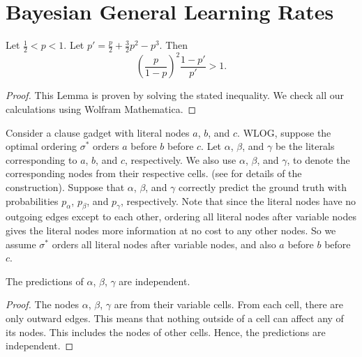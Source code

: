 \section{Bayesian General Learning Rates}
\label{app:bayesian_gadgets}

\begin{lemma}[ ]\label{lemma:twoInformedOneUninformed}
    Let $ \frac 12 < p < 1 $.
    Let $ p' = \frac p2 + \frac 32 p^2 - p^3 $.
    Then \[
        \left( \frac p{1-p} \right)^2 \frac {1-p'}{p'} > 1.
    \]
\end{lemma}

\begin{proof}
    This Lemma is proven by solving the stated inequality.
    We check all our calculations using Wolfram Mathematica.
\end{proof}

Consider a clause gadget with literal nodes $a$, $b$, and $c$.
WLOG, suppose the optimal ordering $\sigma^*$ orders $a$ before $b$ before $c$.
Let $\alpha$, $\beta$, and $\gamma$ be the literals corresponding to $ a $, $ b $, and $ c $, respectively.
We also use $\alpha$, $\beta$, and $\gamma$, to denote the corresponding nodes from their respective cells. (see  for details of the construction).
Suppose that $\alpha$, $\beta$, and $\gamma$ correctly predict the ground truth with probabilities $p_\alpha$, $p_\beta$, and $p_\gamma$, respectively.
Note that since the literal nodes have no outgoing edges except to each other, ordering all literal nodes after variable nodes gives the literal nodes more information at no cost to any other nodes.
So we assume $ \sigma^* $ orders all literal nodes after variable nodes, and also $a$ before $b$ before $c$. 



\begin{observation}
    The predictions of $ \alpha $, $ \beta $, $ \gamma $ are independent.
\end{observation}

\begin{proof}
    The nodes $ \alpha $, $ \beta $, $ \gamma $ are from their variable cells.
    From each cell, there are only outward edges.
    This means that nothing outside of a cell can affect any of its nodes.
    This includes the nodes of other cells.
    Hence, the predictions are independent.
\end{proof}

